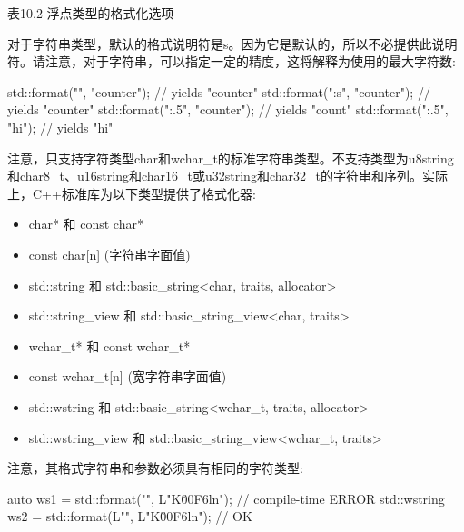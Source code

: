 \begin{center}
表10.2 浮点类型的格式化选项
\end{center}


对于字符串类型，默认的格式说明符是s。因为它是默认的，所以不必提供此说明符。请注意，对于字符串，可以指定一定的精度，这将解释为使用的最大字符数:

\begin{cpp}
std::format("{}", "counter"); // yields "counter"
std::format("{:s}", "counter"); // yields "counter"
std::format("{:.5}", "counter"); // yields "count"
std::format("{:.5}", "hi"); // yields "hi"
\end{cpp}

注意，只支持字符类型char和wchar\_t的标准字符串类型。不支持类型为u8string和char8\_t、u16string和char16\_t或u32string和char32\_t的字符串和序列。实际上，C++标准库为以下类型提供了格式化器:

\begin{itemize}
\item 
char* 和 const char*

\item 
const char[n] (字符串字面值)

\item 
std::string 和 std::basic\_string<char, traits, allocator>

\item 
std::string\_view 和 std::basic\_string\_view<char, traits>

\item 
wchar\_t* 和 const wchar\_t*

\item 
const wchar\_t[n] (宽字符串字面值)

\item 
std::wstring 和 std::basic\_string<wchar\_t, traits, allocator>

\item 
std::wstring\_view 和 std::basic\_string\_view<wchar\_t, traits>
\end{itemize}

注意，其格式字符串和参数必须具有相同的字符类型:

\begin{cpp}
auto ws1 = std::format("{}", L"K\u00F6ln"); // compile-time ERROR
std::wstring ws2 = std::format(L"{}", L"K\u00F6ln"); // OK
\end{cpp}


